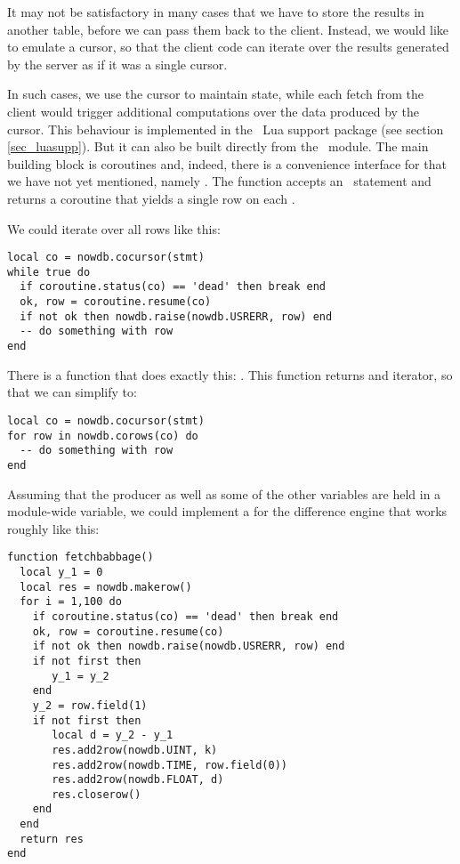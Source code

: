 It may not be satisfactory in many cases
that we have to store the results in another table,
before we can pass them back to the client.
Instead, we would like to emulate a cursor, so that
the client code can iterate over the results
generated by the server as if it was a single cursor.

In such cases, we use the cursor to maintain state,
while each fetch from the client would trigger
additional computations over the data produced
by the cursor. This behaviour is implemented
in the \nowdb\ Lua support package (see section
\ref{sec_luasupp}). But it can also be built
directly from the \nowdb\ module.
The main building block is coroutines and,
indeed, there is a convenience interface
for  that we have not yet mentioned,
namely .
The function accepts an \sql\ statement and
returns a coroutine that yields a single row
on each .

We could iterate over all rows like this:

\begin{lua}
\begin{lstlisting}
local co = nowdb.cocursor(stmt)
while true do
  if coroutine.status(co) == 'dead' then break end
  ok, row = coroutine.resume(co)
  if not ok then nowdb.raise(nowdb.USRERR, row) end
  -- do something with row
end
\end{lstlisting}
\end{lua}

There is a function that does exactly this:
. This function returns
and iterator, so that we can simplify to:

\begin{lua}
\begin{lstlisting}
local co = nowdb.cocursor(stmt)
for row in nowdb.corows(co) do
  -- do something with row
end
\end{lstlisting}
\end{lua}

Assuming that the producer as well as some of the other variables
are held in a module-wide variable,
we could implement a  for the difference engine
that works roughly like this:

\begin{lua}
\begin{lstlisting}
function fetchbabbage()
  local y_1 = 0
  local res = nowdb.makerow()
  for i = 1,100 do
    if coroutine.status(co) == 'dead' then break end
    ok, row = coroutine.resume(co)
    if not ok then nowdb.raise(nowdb.USRERR, row) end
    if not first then
       y_1 = y_2
    end
    y_2 = row.field(1)
    if not first then
       local d = y_2 - y_1
       res.add2row(nowdb.UINT, k)
       res.add2row(nowdb.TIME, row.field(0))
       res.add2row(nowdb.FLOAT, d)
       res.closerow()
    end
  end
  return res
end
\end{lstlisting}
\end{lua}


